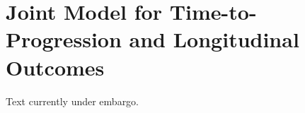 \section{Joint Model for Time-to-Progression and Longitudinal Outcomes}
\label{c4:sec:jointmodel}
Text currently under embargo.